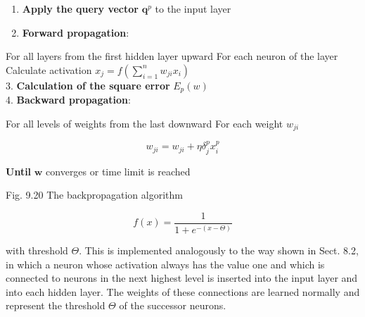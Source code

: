 \documentclass[10pt]{book}
\begin{document}
\begin{enumerate}
  \item \textbf{Apply the query vector} $\boldsymbol{q}^{p}$ to the input layer
  \item \textbf{Forward propagation}:
\end{enumerate}

For all layers from the first hidden layer upward For each neuron of the layer Calculate activation $x_{j}=f\left(\sum_{i=1}^{n} w_{j i} x_{i}\right)$\\
3. \textbf{Calculation of the square error} $E_{p}(w)$\\
4. \textbf{Backward propagation}:

For all levels of weights from the last downward For each weight $w_{j i}$

$$
w_{j i}=w_{j i}+\eta \delta_{j}^{p} x_{i}^{p}
$$

\textbf{Until} $\boldsymbol{w}$ converges or time limit is reached

Fig. 9.20 The backpropagation algorithm

$$
f(x)=\frac{1}{1+e^{-(x-\Theta)}}
$$

with threshold $\Theta$. This is implemented analogously to the way shown in Sect. 8.2, in which a neuron whose activation always has the value one and which is connected to neurons in the next highest level is inserted into the input layer and into each hidden layer. The weights of these connections are learned normally and represent the threshold $\Theta$ of the successor neurons.


\end{document}
